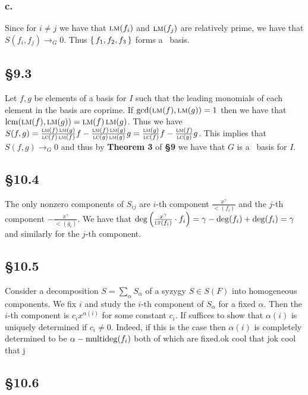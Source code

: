 \documentclass[letterpaper]{article}
\begin{document}
\subsubsection*{c.}

Since for $i \neq j$ we have that $\operatorname{\textsc{lm}}(f_{i})$ and $\operatorname{\textsc{lm}}(f_{j})$ are relatively prime, we have that $S(f_{i}, f_{j}) \to_{G} 0$.
Thus $\set{f_{1}, f_{2}, f_{3}}$ forms a \Grobner\ basis.

\subsection*{\S 9.3}

Let $f, g$ be elements of a basis for $I$ such that the leading monomials of each element in the basis are coprime.
If $\gcd(\operatorname{\textsc{lm}}(f), \operatorname{\textsc{lm}}(g)) = 1$ then we have that $\operatorname{lcm}(\operatorname{\textsc{lm}}(f), \operatorname{\textsc{lm}}(g)) = \operatorname{\textsc{lm}}(f) \operatorname{\textsc{lm}}(g)$.
Thus we have $S(f, g) = \frac{\operatorname{\textsc{lm}}(f) \operatorname{\textsc{lm}}(g)}{\operatorname{\textsc{lc}}(f)\operatorname{\textsc{lm}}(f)} f - \frac{\operatorname{\textsc{lm}}(f) \operatorname{\textsc{lm}}(g)}{\operatorname{\textsc{lc}}(g)\operatorname{\textsc{lm}}(g)} g = \frac{\operatorname{\textsc{lm}}(g)}{\operatorname{\textsc{lc}}(f)} f - \frac{\operatorname{\textsc{lm}}(f)}{\operatorname{\textsc{lc}}(g)} g$.
This implies that $S(f, g) \to_{G} 0$ and thus by \textbf{Theorem 3} of \textbf{\S 9} we have that $G$ is a \Grobner\ basis for $I$.

\subsection*{\S 10.4}

The only nonzero components of $S_{ij}$ are $i$-th component $\frac{x^{\gamma}}{\lt(f_{i})}$ and the $j$-th component $-\frac{x^{\gamma}}{\lt(g_{i})}$.
We have that $\deg\pqty{\frac{x^{\gamma}}{\lt(f_{i})} \cdot f_{i}} = \gamma - \deg(f_{i}) + \deg(f_{i}) = \gamma$ and similarly for the $j$-th component.

\subsection*{\S 10.5}

Consider a decomposition $S = \sum_{\alpha} S_{\alpha}$ of a syzygy $S \in S(F)$ into homogeneous components.
We fix $i$ and study the $i$-th component of $S_{\alpha}$ for a fixed $\alpha$.
Then the $i$-th component is $c_{i}x^{\alpha(i)}$ for some constant $c_{i}$.
If suffices to show that $\alpha(i)$ is uniquely determined if $c_{i} \neq 0$.
Indeed, if this is the case then $\alpha(i)$ is completely determined to be $\alpha - \operatorname{multideg}(f_{i})$ both of which are fixed.ok cool that jok cool that j

\subsection*{\S 10.6}
\end{document}
